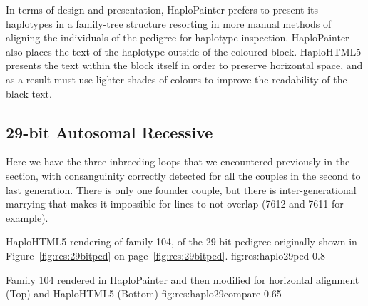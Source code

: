 In terms of design and presentation, HaploPainter prefers to present its haplotypes in a family-tree structure resorting in more manual methods of aligning the individuals of the pedigree for haplotype inspection. HaploPainter also places the text of the haplotype outside of the coloured block. HaploHTML5 presents the text within the block itself in order to preserve horizontal space, and as a result must use lighter shades of colours to improve the readability of the black text.



\subsection{29-bit Autosomal Recessive}

Here we have the three inbreeding loops that we encountered previously in the section, with consanguinity correctly detected for all the couples in the second to last generation.  There is only one founder couple, but there is inter-generational marrying that makes it impossible for lines to not overlap (7612 and 7611 for example).

	{HaploHTML5 rendering of family 104, of the 29-bit pedigree originally shown in Figure~\ref{fig:res:29bitped} on page~\ref{fig:res:29bitped}.}
	{fig:res:haplo29ped}
	{0.8}
	
	{Family 104 rendered in HaploPainter and then modified for horizontal alignment (Top) and HaploHTML5 (Bottom)}
	{fig:res:haplo29compare}
	{0.65}


